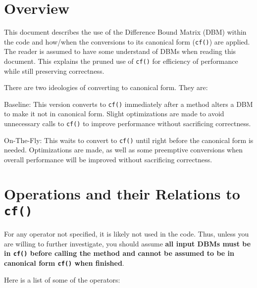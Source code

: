 \documentclass[11pt]{article}
\author{Peter Fontana}
\date{\today}
\begin{document}
\maketitle

\tableofcontents

\section{Overview}

	This document describes the use of the Difference Bound Matrix (DBM) within the code and how/when the conversions to its canonical form (\texttt{cf()}) are applied.  The reader is assumed to have some understand of DBMs when reading this document.  This explains the pruned use of \texttt{cf()} for efficiency of performance while still preserving correctness.
	
	There are two ideologies of converting to canonical form.  They are:
	\begin{descriptionpf}
		\item[Baseline:] This version converts to \texttt{cf()} immediately after a method alters a DBM to make it not in canonical form.  Slight optimizations are made to avoid unnecessary calls to \texttt{cf()} to improve performance without sacrificing correctness.
		\item[On-The-Fly:] This waits to convert to \texttt{cf()} until right before the canonical form is needed.  Optimizations are made, as well as some preemptive conversions when overall performance will be improved without sacrificing correctness. 
	\end{descriptionpf}

\section{Operations and their Relations to \texttt{cf()}}

	For any operator not specified, it is likely not used in the code.  Thus, unless you are willing to further investigate, you should assume \textbf{all input DBMs must be in \texttt{cf()} before calling the method and cannot be assumed to be in canonical form \texttt{cf()} when finished}.
	\par Here is a list of some of the operators:
	
\end{document}

